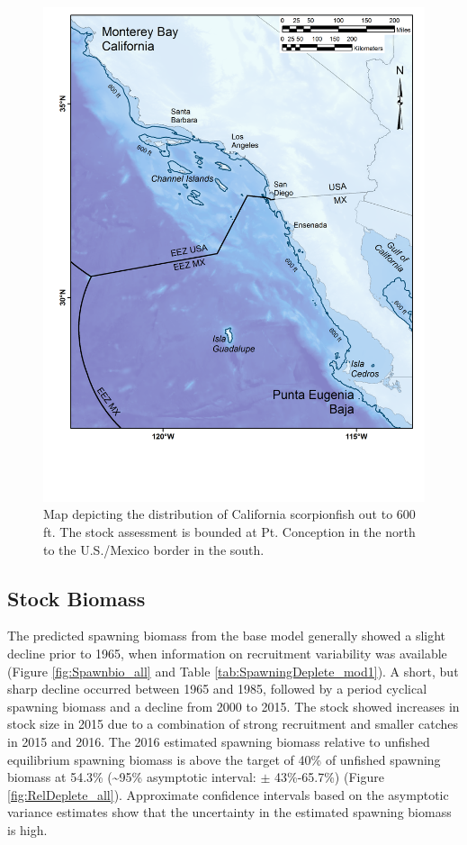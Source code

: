 \documentclass[12pt,]{article}
\begin{document}
\begin{figure}[htbp]
\centering
\includegraphics{Figures/assess_region_map.png}
\caption{Map depicting the distribution of California scorpionfish out
to 600 ft. The stock assessment is bounded at Pt. Conception in the
north to the U.S./Mexico border in the south.
\label{fig:assess_region_map}}
\end{figure}

\FloatBarrier

\subsection*{Stock Biomass}\label{stock-biomass}

The predicted spawning biomass from the base model generally showed a
slight decline prior to 1965, when information on recruitment
variability was available (Figure \ref{fig:Spawnbio_all} and Table
\ref{tab:SpawningDeplete_mod1}). A short, but sharp decline occurred
between 1965 and 1985, followed by a period cyclical spawning biomass
and a decline from 2000 to 2015. The stock showed increases in stock
size in 2015 due to a combination of strong recruitment and smaller
catches in 2015 and 2016. The 2016 estimated spawning biomass relative
to unfished equilibrium spawning biomass is above the target of 40\% of
unfished spawning biomass at 54.3\% (\textasciitilde{}95\% asymptotic
interval: \(\pm\) 43\%-65.7\%) (Figure \ref{fig:RelDeplete_all}).
Approximate confidence intervals based on the asymptotic variance
estimates show that the uncertainty in the estimated spawning biomass is
high.
\end{document}

